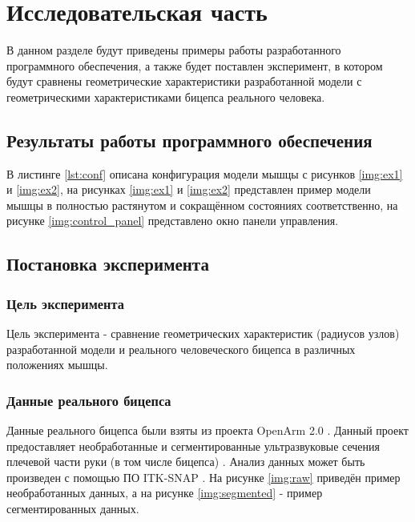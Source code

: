 \chapter{Исследовательская часть}

В данном разделе будут приведены примеры работы разработанного программного обеспечения, а также будет поставлен эксперимент, в котором будут сравнены геометрические характеристики разработанной модели с геометрическими характеристиками бицепса реального человека.

\section{Результаты работы программного обеспечения}

В листинге \ref{lst:conf} описана конфигурация модели мышцы с рисунков \ref{img:ex1} и \ref{img:ex2}, на рисунках \ref{img:ex1} и \ref{img:ex2} представлен пример модели мышцы в полностью растянутом и сокращённом состояниях соответственно, на рисунке \ref{img:control_panel} представлено окно панели управления.

\clearpage
{}
\clearpage
{}

\section{Постановка эксперимента}

\subsection{Цель эксперимента}

Цель эксперимента - сравнение геометрических характеристик (радиусов узлов) разработанной модели и реального человеческого бицепса в различных положениях мышцы.

\subsection{Данные реального бицепса}

Данные реального бицепса были взяты из проекта OpenArm 2.0 \cite{openarm}. Данный проект предоставляет необработанные и сегментированные ультразвуковые сечения плечевой части руки (в том числе бицепса) \cite{openarm1}. Анализ данных может быть произведен с помощью ПО ITK-SNAP \cite{itk}. На рисунке \ref{img:raw} приведён пример необработанных данных, а на рисунке \ref{img:segmented} - пример сегментированных данных.

